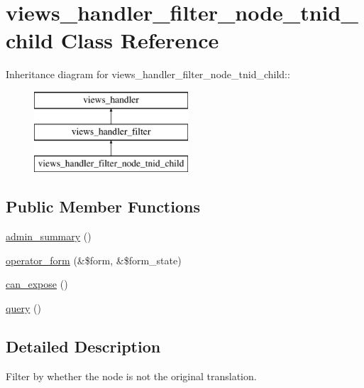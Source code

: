 \hypertarget{classviews__handler__filter__node__tnid__child}{
\section{views\_\-handler\_\-filter\_\-node\_\-tnid\_\-child Class Reference}
\label{classviews__handler__filter__node__tnid__child}
}
Inheritance diagram for views\_\-handler\_\-filter\_\-node\_\-tnid\_\-child::\begin{figure}[H]
\begin{center}
\leavevmode
\includegraphics[height=3cm]{classviews__handler__filter__node__tnid__child}
\end{center}
\end{figure}
\subsection*{Public Member Functions}
\begin{DoxyCompactItemize}
\item 
\hyperlink{classviews__handler__filter__node__tnid__child_a3762760577c3801276a683271be90e47}{admin\_\-summary} ()
\item 
\hyperlink{classviews__handler__filter__node__tnid__child_ae0cfa82e361de74d4f24f820f5106117}{operator\_\-form} (\&\$form, \&\$form\_\-state)
\item 
\hyperlink{classviews__handler__filter__node__tnid__child_a2c6527f01666eaf0ba38eff4798ec732}{can\_\-expose} ()
\item 
\hyperlink{classviews__handler__filter__node__tnid__child_aa21b64d11f0f79a113be65b65e6249e0}{query} ()
\end{DoxyCompactItemize}


\subsection{Detailed Description}
Filter by whether the node is not the original translation. 

